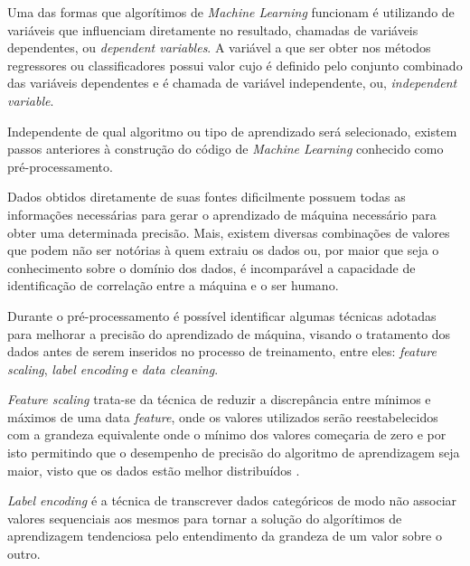 \documentclass[conference]{IEEEtran}
\begin{document}
Uma das formas que algorítimos de \textit{Machine Learning} funcionam é utilizando de variáveis que influenciam diretamente no resultado, chamadas de variáveis dependentes, ou \textit{dependent variables}. A variável a que ser obter nos métodos regressores ou classificadores possui valor cujo é definido pelo conjunto combinado das variáveis dependentes e é chamada de variável independente, ou, \textit{independent variable}. 

Independente de qual algoritmo ou tipo de aprendizado será selecionado, existem passos anteriores à construção do código de \textit{Machine Learning} conhecido como pré-processamento. 

Dados obtidos diretamente de suas fontes dificilmente possuem todas as informações necessárias para gerar o aprendizado de máquina necessário para obter uma determinada precisão. Mais, existem diversas combinações de valores que podem não ser notórias à quem extraiu os dados ou, por maior que seja o conhecimento sobre o domínio dos dados, é incomparável a capacidade de identificação de correlação entre a máquina e o ser humano.

Durante o pré-processamento é possível identificar algumas técnicas adotadas para melhorar a precisão do aprendizado de máquina, visando o tratamento dos dados antes de serem inseridos no processo de treinamento, entre eles: \textit{feature scaling}, \textit{label encoding} e \textit{data cleaning}.

\textit{Feature scaling} trata-se da técnica de reduzir a discrepância entre mínimos e máximos de uma data \textit{feature}, onde os valores utilizados serão reestabelecidos com a grandeza equivalente onde o mínimo dos valores começaria de zero e por isto permitindo que o desempenho de precisão do algoritmo de aprendizagem seja maior, visto que os dados estão melhor distribuídos \cite{pythonmachinelearning}.

\textit{Label encoding} é a técnica de transcrever dados categóricos de modo não associar valores sequenciais aos mesmos para tornar a solução do algorítimos de aprendizagem tendenciosa pelo entendimento da grandeza de um valor sobre o outro. 
\end{document}
